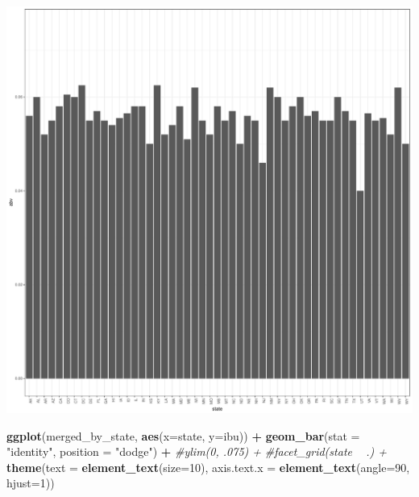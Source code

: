 \documentclass[]{article}
\newenvironment{Shaded}{\begin{snugshade}}{\end{snugshade}}
\newcommand{\KeywordTok}[1]{\textcolor[rgb]{0.13,0.29,0.53}{\textbf{#1}}}
\newcommand{\DataTypeTok}[1]{\textcolor[rgb]{0.13,0.29,0.53}{#1}}
\newcommand{\DecValTok}[1]{\textcolor[rgb]{0.00,0.00,0.81}{#1}}
\newcommand{\StringTok}[1]{\textcolor[rgb]{0.31,0.60,0.02}{#1}}
\newcommand{\CommentTok}[1]{\textcolor[rgb]{0.56,0.35,0.01}{\textit{#1}}}
\newcommand{\OperatorTok}[1]{\textcolor[rgb]{0.81,0.36,0.00}{\textbf{#1}}}
\newcommand{\NormalTok}[1]{#1}
\begin{document}
\begin{center}\includegraphics{Analysis_Final_files/figure-latex/unnamed-chunk-18-1} \end{center}

\begin{Shaded}
\begin{Highlighting}[]
\KeywordTok{ggplot}\NormalTok{(merged_by_state, }\KeywordTok{aes}\NormalTok{(}\DataTypeTok{x=}\NormalTok{state, }\DataTypeTok{y=}\NormalTok{ibu)) }\OperatorTok{+}
\StringTok{  }\KeywordTok{geom_bar}\NormalTok{(}\DataTypeTok{stat =} \StringTok{"identity"}\NormalTok{, }\DataTypeTok{position =} \StringTok{"dodge"}\NormalTok{) }\OperatorTok{+}
\StringTok{  }\CommentTok{#ylim(0, .075) +}
\StringTok{  }\CommentTok{#facet_grid(state ~ .) +}
\StringTok{  }\KeywordTok{theme}\NormalTok{(}\DataTypeTok{text =} \KeywordTok{element_text}\NormalTok{(}\DataTypeTok{size=}\DecValTok{10}\NormalTok{),}
        \DataTypeTok{axis.text.x =} \KeywordTok{element_text}\NormalTok{(}\DataTypeTok{angle=}\DecValTok{90}\NormalTok{, }\DataTypeTok{hjust=}\DecValTok{1}\NormalTok{)) }
\end{Highlighting}
\end{Shaded}
\end{document}
